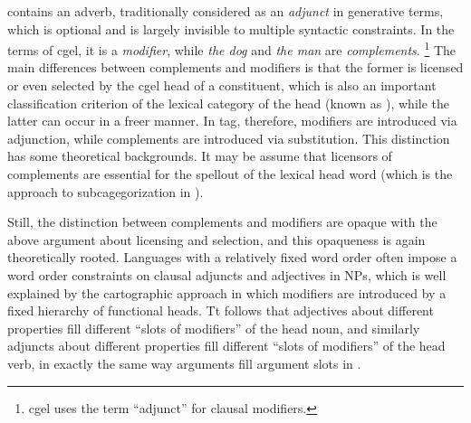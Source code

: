\documentclass[../main.tex]{subfiles}
\begin{document}
 contains an adverb, 
traditionally considered as an \emph{adjunct} in generative terms, 
which is optional and is largely invisible to multiple syntactic constraints. 
In the terms of \ac{cgel}, it is a \emph{modifier}, 
while \emph{the dog} and \emph{the man} are \emph{complements}.%
\footnote{\ac{cgel} uses the term ``adjunct'' for clausal modifiers.}
The main differences between complements and modifiers 
is that the former is licensed or even selected by the \ac{cgel} head of a constituent, 
which is also an important classification criterion 
of the lexical category of the head (known as ),
while the latter can occur in a freer manner. 
In \ac{tag}, therefore, modifiers are introduced via adjunction, 
while complements are introduced via substitution.
This distinction has some theoretical backgrounds.
It may be assume that licensors of complements are essential for the spellout of the lexical head word
(which is the approach to subcagegorization in \citet{siddiqi2009syntax}).

Still, the distinction between complements and modifiers are opaque with 
the above argument about licensing and selection, 
and this opaqueness is again theoretically rooted. 
Languages with a relatively fixed word order often impose 
a word order constraints on clausal adjuncts and adjectives in NPs, 
which is well explained by the cartographic approach in which modifiers 
are introduced by a fixed hierarchy of functional heads. 
Tt follows that adjectives about different properties fill different ``slots of modifiers'' of the head noun, 
and similarly adjuncts about different properties fill different ``slots of modifiers'' of the head verb, 
in exactly the same way arguments fill argument slots in . 
\end{document}
